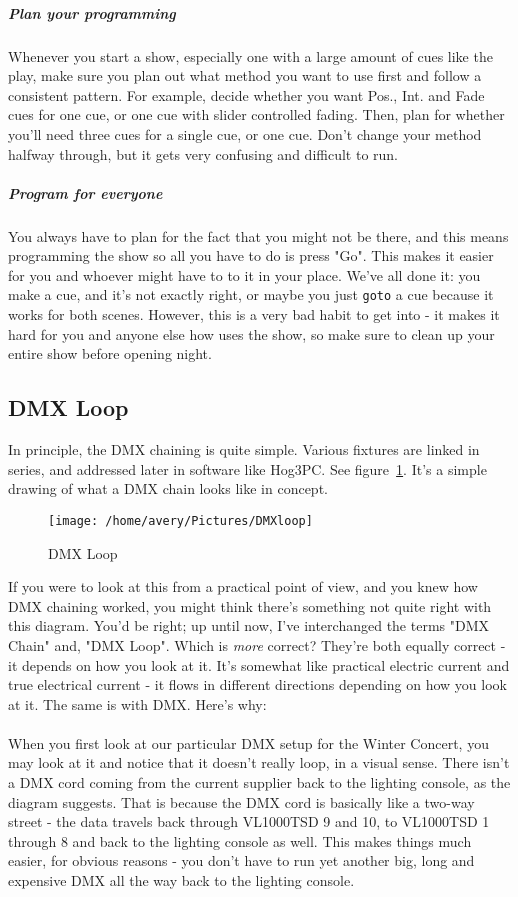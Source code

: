 \documentclass[11pt,a4paper]{book}
\begin{document}
\subparagraph{Plan your programming} Whenever you start a show, especially one with a large amount of cues like the play, make sure you plan out what method you want to use first and follow a consistent pattern. For example, decide whether you want Pos., Int. and Fade cues for one cue, or one cue with slider controlled fading. Then, plan for whether you'll need three cues for a single cue, or one cue. Don't change your method halfway through, but it gets very confusing and difficult to run. 

\subparagraph{Program for everyone} You always have to plan for the fact that you might not be there, and this means programming the show so all you have to do is press "Go". This makes it easier for you and whoever might have to to it in your place. We've all done it: you make a cue, and it's not exactly right, or maybe you just \texttt{goto} a cue because it works for both scenes. However, this is a very bad habit to get into - it makes it hard for you and anyone else how uses the show, so make sure to clean up your entire show before opening night.      

\subsection{DMX Loop}
In principle, the DMX chaining is quite simple. Various fixtures are linked in series, and addressed later in software like Hog3PC. See figure~\ref{DMXloop}. It's a simple drawing of what a DMX chain looks like in concept.
\begin{figure}[h]
\label{DMXloop}
\texttt{[image: /home/avery/Pictures/DMXloop]} 
\caption{DMX Loop}
\end{figure}
If you were to look at this from a practical point of view, and you knew how DMX chaining worked, you might think there's something not quite right with this diagram. You'd be right; up until now, I've interchanged the terms "DMX Chain" and, "DMX Loop". Which is \textit{more} correct? They're both equally correct - it depends on how you look at it. It's somewhat like practical electric current and true electrical current - it flows in different directions depending on how you look at it. The same is with DMX. Here's why:
\\
\\
When you first look at our particular DMX setup for the Winter Concert, you may look at it and notice that it doesn't really loop, in a visual sense. There isn't a DMX cord coming from the current supplier back to the lighting console, as the diagram suggests. That is because the DMX cord is basically like a two-way street - the data travels back through VL1000TSD 9 and 10, to VL1000TSD 1 through 8 and back to the lighting console as well. This makes things much easier, for obvious reasons - you don't have to run yet another big, long and expensive DMX all the way back to the lighting console.  
\end{document}

